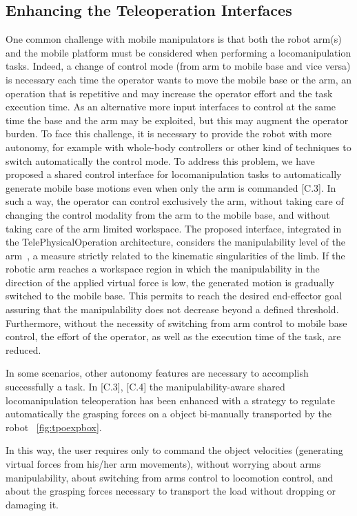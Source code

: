 \subsection{Enhancing the Teleoperation Interfaces}
One common challenge with mobile manipulators is that both the robot arm(s) and the mobile platform must be considered when performing a locomanipulation tasks. Indeed, a change of control mode (from arm to mobile base and vice versa) is necessary each time the operator wants to move the mobile base or the arm, an operation that is repetitive and may increase the operator effort and the task execution time. As an alternative more input interfaces to control at the same time the base and the arm may be exploited, but this may augment the operator burden. To face this challenge, it is necessary to provide the robot with more autonomy, for example with whole-body controllers or other kind of techniques to switch automatically the control mode.
To address this problem, we have proposed a shared control interface for locomanipulation tasks to automatically generate mobile base motions even when only the arm is commanded [C.3]. In such a way, the operator can control exclusively the arm, without taking care of changing the control modality from the arm to the mobile base, and without taking care of the arm limited workspace. The proposed interface, integrated in the TelePhysicalOperation architecture, considers the manipulability level of the arm~\cite{Yoshi1985}, a measure strictly related to the kinematic singularities of the limb. If the robotic arm reaches a workspace region in which the manipulability in the direction of the applied virtual force is low, the generated motion is gradually switched to the mobile base. This permits to reach the desired end-effector goal assuring that the manipulability does not decrease beyond a defined threshold. Furthermore, without the necessity of switching from arm control to mobile base control, the effort of the operator, as well as the execution time of the task, are reduced. 

In some scenarios, other autonomy features are necessary to accomplish successfully a task. In [C.3], [C.4] the manipulability-aware shared locomanipulation teleoperation has been enhanced with a strategy to regulate automatically the grasping forces on a object bi-manually transported by the robot \figurename~\ref{fig:tpoexpbox}.

In this way, the user requires only to command the object velocities (generating virtual forces from his/her arm movements), without worrying about arms manipulability, about switching from arms control to locomotion control, and about the grasping forces necessary to transport the load without dropping or damaging it.


